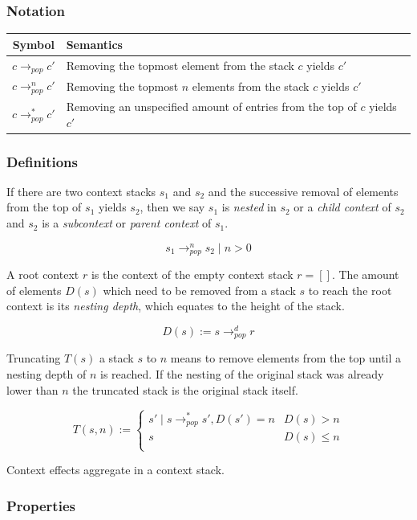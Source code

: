 \subsubsection{Notation}

\begin{tabular}{c | l}
  Symbol & Semantics \\ \hline
  $c \rightarrow_{pop} c'$ & Removing the topmost element from the stack $c$ yields $c'$ \\
  $c \rightarrow_{pop}^n c'$ & Removing the topmost $n$ elements from the stack $c$ yields $c'$ \\
  $c \rightarrow_{pop}^* c'$ & Removing an unspecified amount of entries from the top of $c$ yields $c'$ \\
\end{tabular}

\subsubsection{Definitions}

If there are two context stacks $s_1$ and $s_2$ and the successive removal of elements from the top of $s_1$ yields $s_2$, then we say $s_1$ is \textit{nested} in $s_2$ or a \emph{child context} of $s_2$ and $s_2$ is a \textit{subcontext} or \emph{parent context} of $s_1$.

\[
  s_1 \rightarrow_{pop}^n s_2 \mid n > 0
\]

A root context $r$ is the context of the empty context stack $r = []$.
The amount of elements $D(s)$ which need to be removed from a stack $s$ to reach the root context is its \emph{nesting depth}, which equates to the height of the stack.

\[
  D(s) := s \rightarrow_{pop}^d r
\]

Truncating $T(s)$ a stack $s$ to $n$ means to remove elements from the top until a nesting depth of $n$ is reached.
If the nesting of the original stack was already lower than $n$ the truncated stack is the original stack itself.

\[
  T(s, n) :=
  \begin{cases}
    s' \mid s \rightarrow_{pop}^* s', D(s') = n & D(s) > n \\
    s & D(s) \leq n \\
  \end{cases}
\]

Context effects aggregate in a context stack.


\subsubsection{Properties}

